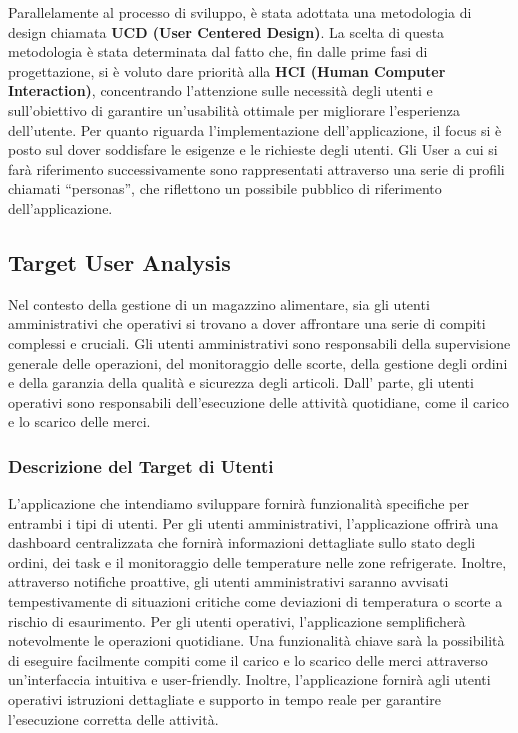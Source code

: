 Parallelamente al processo di sviluppo, è stata adottata una metodologia di design chiamata \textbf{UCD (User Centered Design)}. La scelta di questa metodologia è stata determinata dal fatto che, fin dalle prime fasi di progettazione, si è voluto dare priorità alla \textbf{HCI (Human Computer Interaction)}, concentrando l’attenzione sulle necessità degli utenti e sull’obiettivo di garantire un’usabilità ottimale per migliorare l’esperienza dell’utente. Per quanto riguarda l’implementazione dell’applicazione, il focus si è posto sul dover soddisfare le esigenze e le richieste degli utenti. Gli User a cui si farà riferimento successivamente sono rappresentati attraverso una serie di profili chiamati “personas”, che riflettono un possibile pubblico di riferimento dell’applicazione.
\newpage
\subsection{Target User Analysis}

Nel contesto della gestione di un magazzino alimentare, sia gli utenti amministrativi che operativi si trovano a dover affrontare una serie di compiti complessi e cruciali. Gli utenti amministrativi sono responsabili della supervisione generale delle operazioni, del monitoraggio delle scorte, della gestione degli ordini e della garanzia della qualità e sicurezza degli articoli. Dall' parte, gli utenti operativi sono responsabili dell’esecuzione delle attività quotidiane, come il carico e lo scarico delle merci.

\subsubsection{Descrizione del Target di Utenti}

L'applicazione che intendiamo sviluppare fornirà funzionalità specifiche per entrambi i tipi di utenti. Per gli utenti amministrativi, l’applicazione offrirà una dashboard centralizzata che fornirà informazioni dettagliate sullo stato degli ordini, dei task e il monitoraggio delle temperature nelle zone refrigerate. Inoltre, attraverso notifiche proattive, gli utenti amministrativi saranno avvisati tempestivamente di situazioni critiche come deviazioni di temperatura o scorte a rischio di esaurimento. Per gli utenti operativi, l’applicazione semplificherà notevolmente le operazioni quotidiane. Una funzionalità chiave sarà la possibilità di eseguire facilmente compiti come il carico e lo scarico delle merci attraverso un’interfaccia intuitiva e user-friendly. Inoltre, l’applicazione fornirà agli utenti operativi istruzioni dettagliate e supporto in tempo reale per garantire l’esecuzione corretta delle attività.


